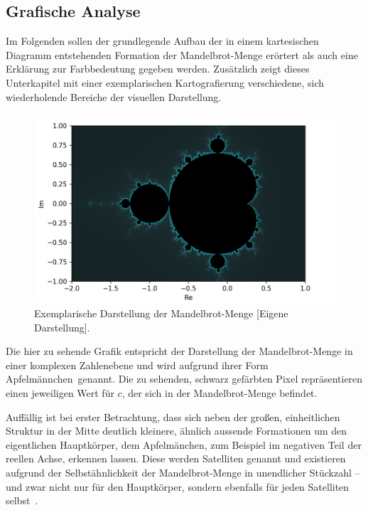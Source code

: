 \subsection{Grafische Analyse}\label{subsec:graphical-analysis}

Im Folgenden sollen der grundlegende Aufbau der in einem kartesischen Diagramm
entstehenden Formation der Mandelbrot-Menge erörtert als auch eine
Erklärung zur Farbbedeutung gegeben werden.
Zusätzlich zeigt dieses Unterkapitel mit einer exemplarischen Kartografierung
verschiedene, sich wiederholende Bereiche der visuellen Darstellung.

\begin{figure}[h!]
  \centering
  \includegraphics[width=\textwidth]{images/mandelbrotImage}
  \caption[Caption for LOF]{
    Exemplarische Darstellung der Mandelbrot-Menge [Eigene Darstellung]\footnotemark.
  }
  \label{fig:mandelbrot-set}
\end{figure}

Die hier zu sehende Grafik entspricht der Darstellung der Mandelbrot-Menge
in einer komplexen Zahlenebene und wird aufgrund ihrer Form
\glqq Apfelmännchen\grqq~genannt.
Die zu sehenden, schwarz gefärbten Pixel repräsentieren einen
jeweiligen Wert für $c$, der sich in der Mandelbrot-Menge befindet.

Auffällig ist bei erster Betrachtung, dass sich neben der großen,
einheitlichen Struktur in der Mitte deutlich kleinere,
ähnlich aussende Formationen um den eigentlichen Hauptkörper,
dem Apfelmänchen, zum Beispiel im negativen Teil der reellen Achse,
erkennen lassen.
Diese werden Satelliten genannt und existieren aufgrund der Selbstähnlichkeit
der Mandelbrot-Menge in unendlicher Stückzahl -- und zwar nicht nur für den Hauptkörper,
sondern ebenfalls für jeden Satelliten selbst~\cite{lomonaco_quasi-conformal_2018}.

